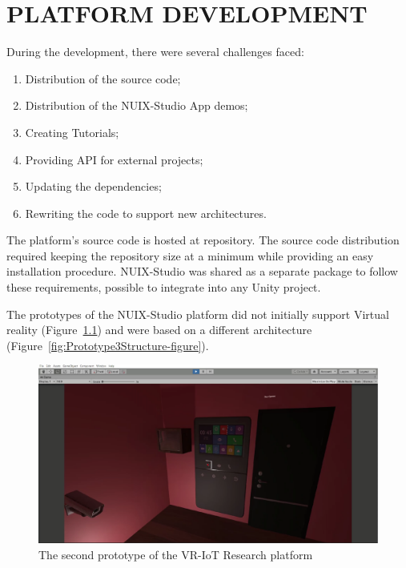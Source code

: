 
\chapter{PLATFORM DEVELOPMENT}

During the development, there were several challenges faced:
\begin{enumerate}
    \item Distribution of the source code;
    \item Distribution of the NUIX-Studio App demos;
    \item Creating Tutorials;
    \item Providing API for external projects;
    \item Updating the dependencies;
    \item Rewriting the code to support new architectures.
\end{enumerate}

The platform's source code is hosted at \cite{NUIXStudio} repository. The source code distribution required keeping the repository size at a minimum while providing an easy installation procedure. NUIX-Studio was shared as a separate package to follow these requirements, possible to integrate into any Unity project.

The prototypes of the NUIX-Studio platform did not initially support Virtual reality (Figure~\ref{fig:Prototype2-figure}) and were based on a different architecture (Figure~\ref{fig:Prototype3Structure-figure}).


\begin{figure}
  \centering
  \includegraphics[width=0.6\linewidth]{figures/Prototype2.png}
  \caption{The second prototype of the VR-IoT Research platform}
  \label{fig:Prototype2-figure}
\end{figure}

